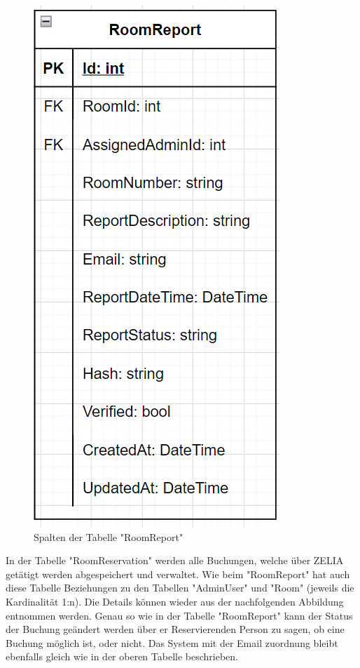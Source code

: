 \begin{figure}[H]
    \centering
    \includegraphics{media/MariaDB/RoomReport.png}
    \caption{Spalten der Tabelle "RoomReport"}
\end{figure}


In der Tabelle "RoomReservation" werden alle Buchungen, welche über ZELIA getätigt werden abgespeichert und verwaltet. Wie beim "RoomReport" hat auch diese Tabelle Beziehungen zu den Tabellen "AdminUser" und "Room" (jeweils die Kardinalität 1:n). Die Details können wieder aus der nachfolgenden Abbildung entnommen werden. Genau so wie in der Tabelle "RoomReport" kann der Status der Buchung geändert werden über er Reservierenden Person zu sagen, ob eine Buchung möglich ist, oder nicht. Das System mit der Email zuordnung bleibt ebenfalls gleich wie in der oberen Tabelle beschrieben.

